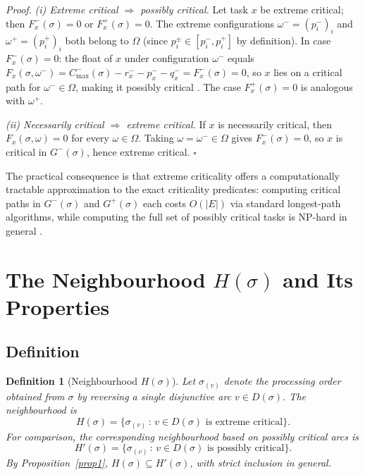 \documentclass[preprint,12pt]{elsarticle}
\newtheorem{definition}{Definition}
\newenvironment{proof}%
  {\noindent\textit{Proof.}\enspace}%
  {\hfill$\square$\par\medskip}
\begin{document}
\begin{proof}
\textit{(i) Extreme critical $\Rightarrow$ possibly critical.}
Let task $x$ be extreme critical; then $F_x^-(\sigma)=0$ or $F_x^+(\sigma)=0$.
The extreme configurations $\omega^- = (p_i^-)_{i}$ and $\omega^+ = (p_i^+)_{i}$ both belong to $\Omega$
(since $p_i^{\pm}\in[p_i^-,p_i^+]$ by definition).
In case $F_x^-(\sigma)=0$: the float of $x$ under configuration $\omega^-$ equals
$F_x(\sigma,\omega^-)=C_{\max}^-(\sigma)-r_x^- - p_x^- - q_x^- = F_x^-(\sigma)=0$,
so $x$ lies on a critical path for $\omega^-\in\Omega$, making it possibly critical \cite{Artigues2015}.
The case $F_x^+(\sigma)=0$ is analogous with $\omega^+$.

\textit{(ii) Necessarily critical $\Rightarrow$ extreme critical.}
If $x$ is necessarily critical, then $F_x(\sigma,\omega)=0$ for every $\omega\in\Omega$.
Taking $\omega=\omega^-\in\Omega$ gives $F_x^-(\sigma)=0$, so $x$ is critical in $G^-(\sigma)$, hence extreme critical.
\end{proof}

\medskip

The practical consequence is that extreme criticality offers a computationally tractable approximation to the exact criticality predicates: computing critical paths in $G^-(\sigma)$ and $G^+(\sigma)$ each costs $O(|E|)$ via standard longest-path algorithms, while computing the full set of possibly critical tasks is NP-hard in general \cite{Artigues2015}.


\section{The Neighbourhood $H(\sigma)$ and Its Properties}
\label{sec4}

\subsection{Definition}
\label{sec4.1}

\begin{definition}[Neighbourhood $H(\sigma)$]
\label{def2}
Let $\sigma_{(v)}$ denote the processing order obtained from $\sigma$ by reversing a single disjunctive arc $v \in D(\sigma)$. The neighbourhood is
\begin{equation}
H(\sigma) = \{ \sigma_{(v)} \,:\, v \in D(\sigma) \text{ is extreme critical}\}.
\end{equation}
For comparison, the corresponding neighbourhood based on \emph{possibly} critical arcs is
\begin{equation}
H'(\sigma) = \{ \sigma_{(v)} \,:\, v \in D(\sigma) \text{ is possibly critical}\}.
\end{equation}
By Proposition~\ref{prop1}, $H(\sigma) \subseteq H'(\sigma)$, with strict inclusion in general.
\end{definition}
\end{document}
